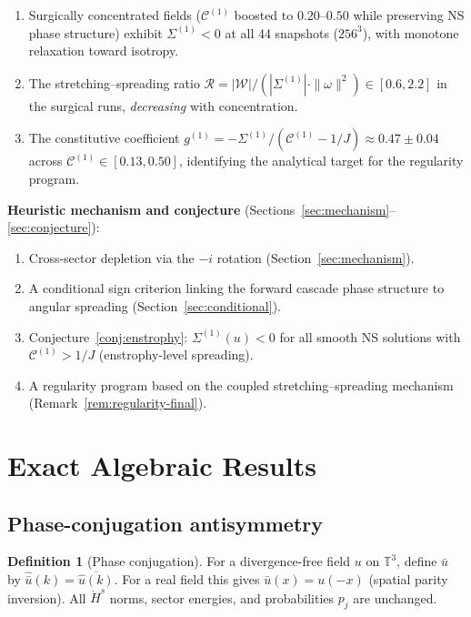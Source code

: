 \documentclass[11pt]{article}
\theoremstyle{definition}
\newtheorem{definition}[theorem]{Definition}
\newcommand{\T}{\mathbb{T}}
\newcommand{\Hdot}[1]{\dot{H}^{#1}}
\newcommand{\cC}{\mathcal{C}}
\begin{document}
\begin{enumerate}[leftmargin=2em,label=(N\arabic*)]
  for $f\leq 0.5$).
\item Surgically concentrated fields ($\cC^{(1)}$ boosted
  to $0.20$--$0.50$ while preserving NS phase structure)
  exhibit $\Sigma^{(1)}<0$ at all 44 snapshots ($256^3$),
  with monotone relaxation toward isotropy.
\item The stretching--spreading ratio
  $\mathcal{R}=|\mathcal{W}|/(|\Sigma^{(1)}|
  \cdot\|\omega\|^2)\in[0.6,2.2]$ in the surgical runs,
  \emph{decreasing} with concentration.
\item The constitutive coefficient $g^{(1)} =
  -\Sigma^{(1)}/(\cC^{(1)}-1/J) \approx 0.47\pm 0.04$
  across $\cC^{(1)}\in[0.13, 0.50]$, identifying the
  analytical target for the regularity program.
\end{enumerate}

\noindent\textbf{Heuristic mechanism and conjecture}
(Sections~\ref{sec:mechanism}--\ref{sec:conjecture}):
\begin{enumerate}[leftmargin=2em,label=(H\arabic*)]
\item Cross-sector depletion via the $-i$ rotation
  (Section~\ref{sec:mechanism}).
\item A conditional sign criterion linking the forward
  cascade phase structure to angular spreading
  (Section~\ref{sec:conditional}).
\item Conjecture~\ref{conj:enstrophy}: $\Sigma^{(1)}(u)<0$
  for all smooth NS solutions with $\cC^{(1)} > 1/J$
  (enstrophy-level spreading).
\item A regularity program based on the coupled
  stretching--spreading mechanism
  (Remark~\ref{rem:regularity-final}).
\end{enumerate}

\section{Exact Algebraic Results}
\label{sec:general}

\subsection{Phase-conjugation antisymmetry}

\begin{definition}[Phase conjugation]
\label{def:conj}
For a divergence-free field $u$ on $\T^3$, define
$\bar u$ by $\hat{\bar u}(k) = \overline{\hat u(k)}$.
For a real field this gives $\bar u(x)=u(-x)$ (spatial
parity inversion).  All $\Hdot{s}$ norms, sector energies,
and probabilities $p_j$ are unchanged.
\end{definition}
\end{document}
